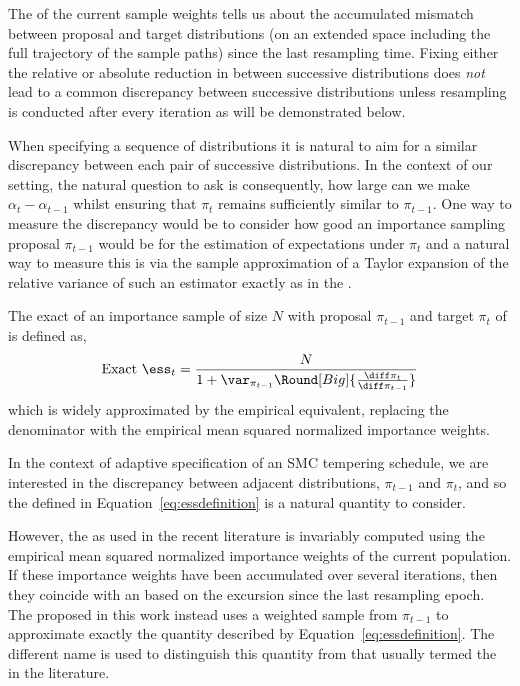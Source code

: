 The \ess of the current sample weights tells us about the accumulated mismatch
between proposal and target distributions (on an extended space including the
full trajectory of the sample paths) since the last resampling time. Fixing
either the relative or absolute reduction in \ess between successive
distributions does \emph{not} lead to a common discrepancy between successive
distributions unless resampling is conducted after every iteration as will be
demonstrated below.

When specifying a sequence of distributions it is natural to aim for a similar
discrepancy between each pair of successive distributions. In the context of
our setting, the natural question to ask is consequently, how large
can we make $\alpha_t - \alpha_{t-1}$ whilst ensuring that $\pi_{t}$ remains
sufficiently similar to $\pi_{t-1}$. One way to measure the discrepancy would
be to consider how good an importance sampling proposal $\pi_{t-1}$ would be
for the estimation of expectations under $\pi_t$ and a natural way to measure
this is via the sample approximation of a Taylor expansion of the relative
variance of such an estimator exactly as in the \ess.

The exact \ess of an importance sample of size $N$ with proposal $\pi_{t-1}$
and target $\pi_t$ of \cite{Kong:1994ul} is defined as,
\begin{equation}
  \text{Exact }\ess_t =
  \frac{N}{1 + \var_{\pi_{t-1}}\Round[Big]{\frac{\diff\pi_t}{\diff\pi_{t-1}}}}
  \label{eq:essdefinition}
\end{equation}
which is widely approximated by the empirical equivalent, replacing the
denominator with the empirical mean squared normalized importance weights.

In the context of adaptive specification of an SMC tempering schedule, we are
interested in the discrepancy between adjacent distributions, $\pi_{t-1}$ and
$\pi_t$, and so the \ess defined in Equation~\eqref{eq:essdefinition} is a
natural quantity to consider.

However, the \ess as used in the recent \smc literature is invariably computed
using the empirical mean squared normalized importance weights of the current
population. If these importance weights have been accumulated over several
iterations, then they coincide with an \ess based on the excursion since the
last resampling epoch. The \cess proposed in this work instead uses a weighted
sample from $\pi_{t-1}$ to approximate exactly the quantity described by
Equation~\eqref{eq:essdefinition}. The different name is used to distinguish
this quantity from that usually termed the \ess in the \smc literature.

